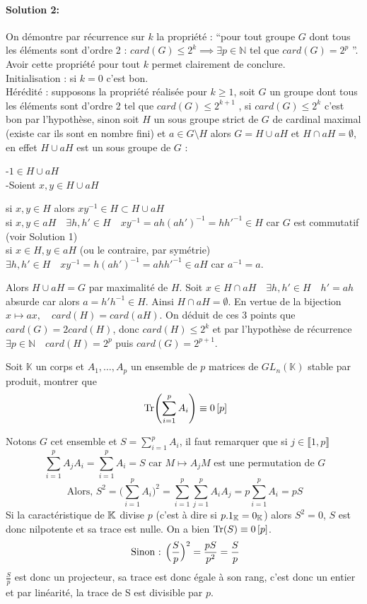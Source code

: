 \documentclass[letterpaper,10pt]{article}
\begin{document}
{\paragraph{Solution 2:}
On démontre par récurrence sur $k$ la propriété : ``pour tout groupe $G$ dont tous les éléments sont d'ordre 2 : $card(G) \leq 2^k \implies \exists p \in \mathbb{N}$ tel que $card(G) = 2^p$ ''. Avoir cette propriété pour tout $k$ permet clairement de conclure. \\
Initialisation :  si $k = 0$ c'est bon.\\
Hérédité : supposons la propriété réalisée pour $k \geq 1$, soit $G$
un groupe dont tous les éléments sont d'ordre 2 tel 
que $card(G) \leq 2^{k+1}$ , si $card(G) \leq 2^k$ c'est bon par 
l'hypothèse, sinon soit $H$ un sous groupe strict de $G$ de cardinal 
maximal (existe car ils sont en nombre fini) et $a \in G\setminus H$ 
alors $G = H \cup aH$ et $H\cap aH=\emptyset$, en effet $H\cup aH$ est 
un sous groupe de $G$ :
\par\leftskip 10pt
-$ 1 \in H\cup aH$\\
-Soient $x,y \in H\cup aH$
\par\leftskip 20pt
si $x,y \in H$ alors $xy^{-1} \in H \subset H\cup aH$\\si $x,y\in aH\quad \exists h,h'\in H \quad xy^{-1} = ah(ah')^{-1} = hh'^{-1} \in H$ car $G$ est commutatif (voir Solution 1)\\ si $x\in H,y\in aH$ (ou le contraire, par symétrie) $\exists h,h'\in H \quad xy^{-1} = h(ah')^{-1} = ahh'^{-1} \in aH$ car $a^{-1} =a$.\par
\leftskip 0pt
Alors $H\cup aH = G$ par maximalité de $H$. Soit $x\in H \cap aH \quad \exists h,h' \in H \quad h' = ah$ absurde car alors $a= h'h^{-1} \in H$. Ainsi $H\cap aH=\emptyset$. En vertue de la bijection $x \mapsto ax,\quad card(H) =card(aH)$. On déduit de ces 3 points que $card(G) = 2card(H)$, donc $card(H) \leq 2^k$ et par l'hypothèse de récurrence $\exists p \in \mathbb{N} \quad card(H) = 2^p$ puis $card(G) = 2^{p+1}$.
}
{
  Soit $\mathbb{K}$ un corps et $A_1, \ldots,A_p$ un ensemble de $p$ matrices de $GL_n(\mathbb{K})$ stable
par produit, montrer que \[\ \tx{Tr}\Biggl(\sum_{i=1}^p A_i\Biggr) \equiv 0\left[p\right] \]
}
{
  Notons $G$ cet ensemble et $S = \sum_{i=1}^pA_i$, il faut remarquer que si $j \in \llbracket 1 , p \rrbracket$ 
\[\ \sum_{i=1}^pA_jA_i = \sum_{i=1}^pA_i = S \text{ car } M \mapsto A_jM \text{ est une permutation de } G \] \[\ \text{Alors, }
S^2 = \Biggl(\sum_{i=1}^pA_i\Biggr)^2 =  \sum_{i=1}^p\sum_{j=1}^pA_iA_j = p\sum_{i=1}^pA_i = pS
\] Si la caractéristique de $\mathbb{K}$ divise $p$ (c'est à dire si $p.1_{\mathbb{K}} = 0_{\mathbb{K}}$) alors $S^2=0$, $S$ est donc nilpotente et sa trace est nulle.
On a bien $\mathrm{Tr}(S) \equiv 0 \left[p\right] $.   \[\ \text{Sinon : }\Bigl(\frac{S}{p}\Bigr)^2 = \frac{pS}{p^2} = \frac{S}{p} \] $\frac{S}{p}$ est donc un projecteur,  sa trace est donc égale à son rang, c'est donc un entier et par linéarité, la trace de S est divisible par $p$. 

}
\end{document}
